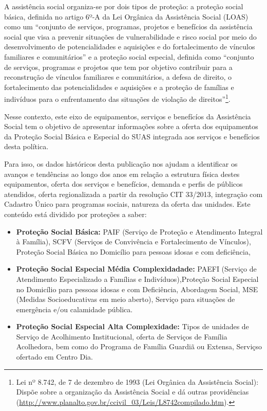 \documentclass[
  brazilian]{report}
\begin{document}
A assistência social organiza-se por dois tipos de proteção: a proteção
social básica, definida no artigo 6º-A da Lei Orgânica da Assistência
Social (LOAS) como um ``conjunto de serviços, programas, projetos e
benefícios da assistência social que visa a prevenir situações de
vulnerabilidade e risco social por meio do desenvolvimento de
potencialidades e aquisições e do fortalecimento de vínculos familiares
e comunitários'' e a proteção social especial, definida como ``conjunto
de serviços, programas e projetos que tem por objetivo contribuir para a
reconstrução de vínculos familiares e comunitários, a defesa de direito,
o fortalecimento das potencialidades e aquisições e a proteção de
famílias e indivíduos para o enfrentamento das situações de violação de
direitos''\footnote{Lei nº 8.742, de 7 de dezembro de 1993 (Lei Orgânica da Assistência Social): Dispõe sobre a organização da Assistência Social e dá outras providências (\url{http://www.planalto.gov.br/ccivil_03/Leis/L8742compilado.htm}).}.

Nesse contexto, este eixo de equipamentos, serviços e benefícíos da
Assistência Social tem o objetivo de apresentar informações sobre a
oferta dos equipamentos da Proteção Social Básica e Especial do SUAS
integrada aos serviços e benefícios desta política.

Para isso, os dados históricos desta publicação nos ajudam a identificar
os avanços e tendências ao longo dos anos em relação a estrutura física
destes equipamentos, oferta dos serviços e benefícios, demanda e perfis
de públicos atendidos, oferta regionalizada a partir da resolução CIT
33/2013, integração com Cadastro Único para programas sociais, natureza
da oferta das unidades. Este conteúdo está dividido por proteções a
saber:

\begin{itemize}
\item
  \textbf{Proteção Social Básica:} PAIF (Serviço de Proteção e
  Atendimento Integral à Família), SCFV (Serviços de Convivência e
  Fortalecimento de Vínculos), Proteção Social Básica no Domicílio para
  pessoas idosas e com deficiência,
\item
  \textbf{Proteção Social Especial Média Complexidadade:} PAEFI (Serviço
  de Atendimento Especializado a Famílias e Indivíduos),Proteção Social
  Especial no Domicílio para pessoas idosas e com Deficiência, Abordagem
  Social, MSE (Medidas Socioeducativas em meio aberto), Serviço para
  situações de emergência e/ou calamidade pública.
\item
  \textbf{Proteção Social Especial Alta Complexidade:} Tipos de unidades
  de Serviço de Acolhimento Institucional, oferta de Serviços de Família
  Acolhedora, bem como do Programa de Família Guardiã ou Extensa,
  Serviçso ofertado em Centro Dia.
\end{itemize}
\end{document}
